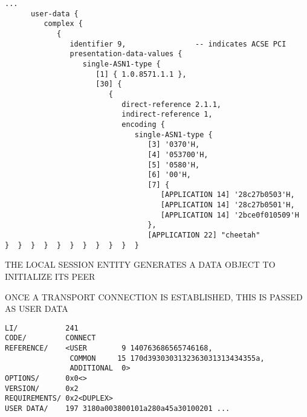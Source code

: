 \begin{bwslide}

\scriptsize
\begin{verbatim}
...
      user-data {
         complex {
            {
               identifier 9,                -- indicates ACSE PCI
               presentation-data-values {
                  single-ASN1-type {
                     [1] { 1.0.8571.1.1 },
                     [30] {
                        {
                           direct-reference 2.1.1,
                           indirect-reference 1,
                           encoding {
                              single-ASN1-type {
                                 [3] '0370'H,
                                 [4] '053700'H,
                                 [5] '0580'H,
                                 [6] '00'H,
                                 [7] {
                                    [APPLICATION 14] '28c27b0503'H,
                                    [APPLICATION 14] '28c27b0501'H,
                                    [APPLICATION 14] '2bce0f010509'H
                                 },
                                 [APPLICATION 22] "cheetah"
}  }  }  }  }  }  }  }  }  }  }
\end{verbatim}
\end{bwslide}


\begin{bwslide}

\begin{nrtc}
\item	THE LOCAL SESSION ENTITY GENERATES A DATA OBJECT TO INITIALIZE
	ITS PEER

\item	ONCE A TRANSPORT CONNECTION IS ESTABLISHED, THIS IS PASSED AS USER DATA
\end{nrtc}
\end{bwslide}


\begin{bwslide}

\smaller
\begin{verbatim}
LI/           241
CODE/         CONNECT
REFERENCE/    <USER        9 140763686565746168,
               COMMON     15 170d3930303132363031313434355a,
               ADDITIONAL  0>
OPTIONS/      0x0<>
VERSION/      0x2
REQUIREMENTS/ 0x2<DUPLEX>
USER DATA/    197 3180a003800101a280a45a30100201 ...
\end{verbatim}
\end{bwslide}


